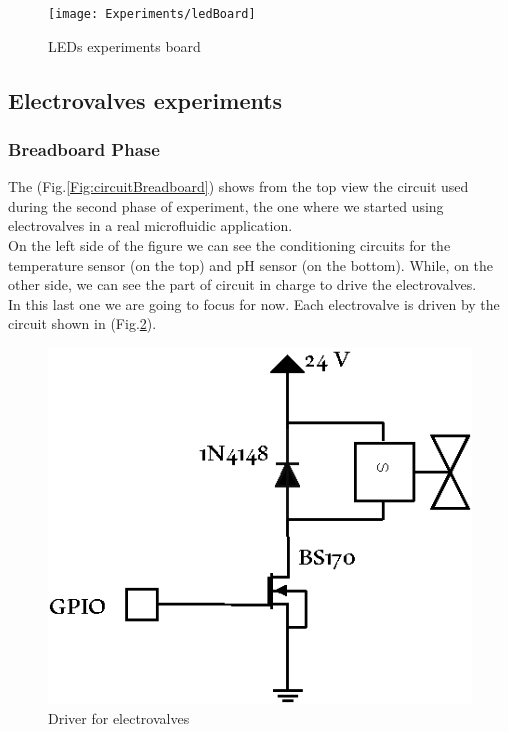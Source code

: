 \documentclass[12pt,a4paper,twoside]{article}
\begin{document}
	
	\begin{figure}[h]
		\centering
		\texttt{[image: Experiments/ledBoard]}
		\caption{LEDs experiments board}
		\label{Fig:circuitLED}
	\end{figure}
	
	
	\subsection*{Electrovalves experiments}
	
	\subsubsection*{Breadboard Phase}
	The (Fig.\ref{Fig:circuitBreadboard}) shows from the top view the circuit used during the second phase of experiment, the one where we started using electrovalves in a real microfluidic application.\\
	On the left side of the figure we can see the conditioning circuits for the temperature sensor (on the top) and pH sensor (on the bottom). While, on the other side, we can see the part of circuit in charge to drive the electrovalves.\\
	In this last one we are going to focus for now. Each electrovalve is driven by the circuit shown in (Fig.\ref{Fig:driverEV}).
	\clearpage
	
	\begin{figure}[h]
		\centering
		\includegraphics[]{Driver/driverEV}
		\caption{Driver for electrovalves}
		\label{Fig:driverEV}
	\end{figure}
	
\end{document}
